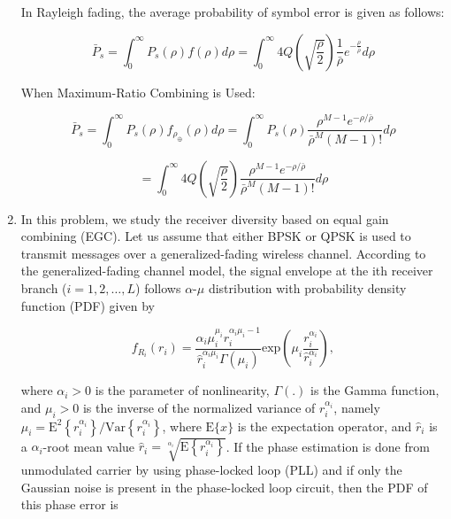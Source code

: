 \documentclass[fleqn]{article}
\makeatletter
\newenvironment{equationCenter}{\@fleqnfalse\begin{equation*}}{\end{equation*}}
\makeatother
\begin{document}
\begin{enumerate}
		In Rayleigh fading, the average probability of symbol error is given as follows:
		
		\begin{equation*}
			\bar{P}_s = \int_{0}^{\infty}{P_s(\rho)f(\rho)d\rho} = \int_{0}^{\infty}{4Q\left(\sqrt{\frac{\rho}{2}}\right)\frac{1}{\bar{\rho}}e^{-\frac{\rho}{\bar{\rho}}}d\rho}
		\end{equation*}
		
		When Maximum-Ratio Combining is Used:
		
		\begin{equation*}
			\bar{P}_s = \int_{0}^{\infty}{P_s(\rho)f_{\rho_{\oplus}}(\rho)d\rho} = \int_{0}^{\infty}{P_s(\rho)\frac{\rho^{M-1}e^{-\rho/\bar{\rho}}}{\bar{\rho}^M(M-1)!}d\rho}
		\end{equation*}
		
		\begin{equation*}
			= \int_{0}^{\infty}{4Q\left(\sqrt{\frac{\rho}{2}}\right)\frac{\rho^{M-1}e^{-\rho/\bar{\rho}}}{\bar{\rho}^M(M-1)!}d\rho}
		\end{equation*}
		
		\item In this problem, we study the receiver diversity based on equal gain combining (EGC). Let us assume that either BPSK or QPSK is used to transmit messages over a generalized-fading wireless channel. According to
the generalized-fading channel model, the signal envelope at the ith receiver branch ($i=1,2,\ldots,L$) follows $\alpha$-$\mu$ distribution with probability density function (PDF) given by

		\begin{equationCenter}
			f_{R_i}(r_i) = \frac{\alpha_i\mu_i^{\mu_i}r_i^{\alpha_i\mu_i-1}}{\hat{r}_i^{\alpha_i\mu_i}\Gamma(\mu_i)}\text{exp}\left(\mu_i\frac{r_i^{\alpha_i}}{\hat{r}_i^{\alpha_i}}\right),
		\end{equationCenter}
		
		where $\alpha_i > 0$ is the parameter of nonlinearity, $\Gamma(.)$ is the Gamma function, and $\mu_i > 0$ is the inverse of the normalized variance of $r_i^{\alpha_i}$, namely $\mu_i = \text{E}^2\left\{r_i^{\alpha_i}\right\}/\text{Var}\left\{r_i^{\alpha_i}\right\}$, where $\text{E}\{x\}$ is the expectation operator, and $\hat{r}_i$ is a $\alpha_i$-root mean value $\hat{r}_i=\sqrt[\alpha_i]{\text{E}\left\{r_i^{\alpha_i}\right\}}$. If the phase estimation is done from unmodulated carrier by using phase-locked loop (PLL) and if only the Gaussian noise is present in the phase-locked loop circuit, then the PDF of this phase error is


\end{enumerate}
\end{document}

